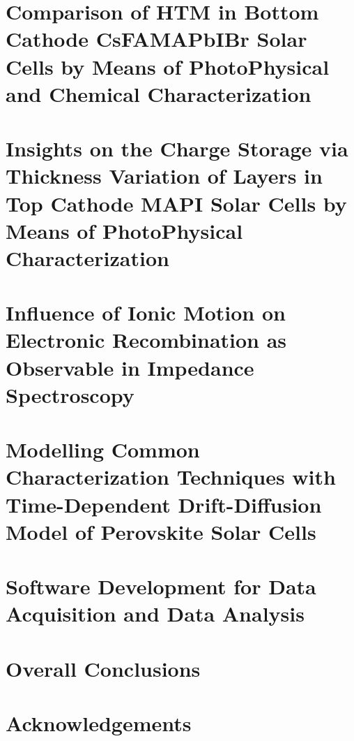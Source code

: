 \documentclass[b5paper, 12pt, openright]{book} %
\begin{document}
\chapter{Comparison of HTM in Bottom Cathode CsFAMAPbIBr Solar Cells by Means of PhotoPhysical and Chemical Characterization}\label{ch:tae}
	\graphicspath{ {./contents_img/tae/} }
	

\chapter{Insights on the Charge Storage via Thickness Variation of Layers in Top Cathode MAPI Solar Cells by Means of PhotoPhysical Characterization}\label{ch:thicknesses}
	\graphicspath{ {./contents_img/thicknesses/} }
	

\chapter{Influence of Ionic Motion on Electronic Recombination as Observable in Impedance Spectroscopy}\label{ch:impedance}
	\graphicspath{ {./contents_img/impedance/} }
	

\chapter{Modelling Common Characterization Techniques with Time-Dependent Drift-Diffusion Model of Perovskite Solar Cells}\label{ch:modelling}
	\graphicspath{ {./contents_img/modelling/} }
	

\chapter{Software Development for Data Acquisition and Data Analysis}\label{ch:software}
	\graphicspath{ {./contents_img/software/} }
	

\chapter*[Overall Conclusions]{Overall Conclusions}\label{ch:conclusions}
	

\chapter*[Acknowledgements]{Acknowledgements}
	
\end{document}
